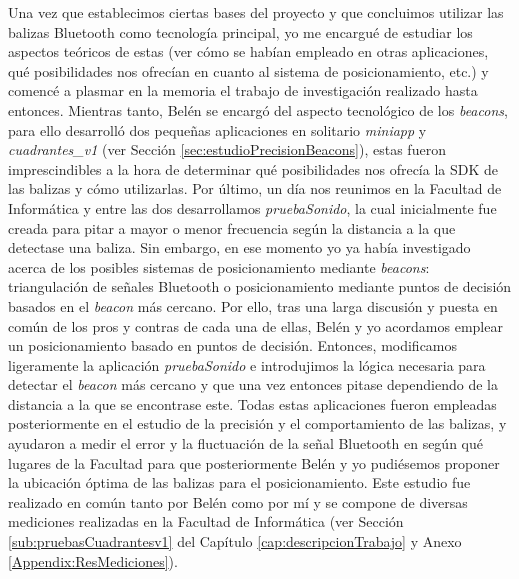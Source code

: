 Una vez que establecimos ciertas bases del proyecto y que concluimos utilizar las balizas Bluetooth como tecnología principal, yo me encargué de estudiar los aspectos teóricos de estas (ver cómo se habían empleado en otras aplicaciones, qué posibilidades nos ofrecían en cuanto al sistema de posicionamiento, etc.) y comencé a plasmar en la memoria el trabajo de investigación realizado hasta entonces. Mientras tanto, Belén se encargó del aspecto tecnológico de los \textit{beacons}, para ello desarrolló dos pequeñas aplicaciones en solitario \textit{miniapp} y \textit{cuadrantes\_v1} (ver Sección \ref{sec:estudioPrecisionBeacons}), estas fueron imprescindibles a la hora de determinar qué posibilidades nos ofrecía la SDK de las balizas y cómo utilizarlas. Por último, un día nos reunimos en la Facultad de Informática y entre las dos desarrollamos \textit{pruebaSonido}, la cual inicialmente fue creada para pitar a mayor o menor frecuencia según la distancia a la que detectase una baliza. Sin embargo, en ese momento yo ya había investigado acerca de los posibles sistemas de posicionamiento mediante \textit{beacons}: triangulación de señales Bluetooth o posicionamiento mediante puntos de decisión basados en el \textit{beacon} más cercano. Por ello, tras una larga discusión y puesta en común de los pros y contras de cada una de ellas, Belén y yo acordamos emplear un posicionamiento basado en puntos de decisión. Entonces, modificamos ligeramente la aplicación \textit{pruebaSonido} e introdujimos la lógica necesaria para detectar el \textit{beacon} más cercano y que una vez entonces pitase dependiendo de la distancia a la que se encontrase este. Todas estas aplicaciones fueron empleadas posteriormente en el estudio de la precisión y el comportamiento de las balizas, y ayudaron a medir el error y la fluctuación de la señal Bluetooth en según qué lugares de la Facultad para que posteriormente Belén y yo pudiésemos proponer la ubicación óptima de las balizas para el posicionamiento. Este estudio fue realizado en común tanto por Belén como por mí y se compone de diversas mediciones realizadas en la Facultad de Informática (ver Sección \ref{sub:pruebasCuadrantesv1} del Capítulo \ref{cap:descripcionTrabajo} y Anexo \ref{Appendix:ResMediciones}). 

